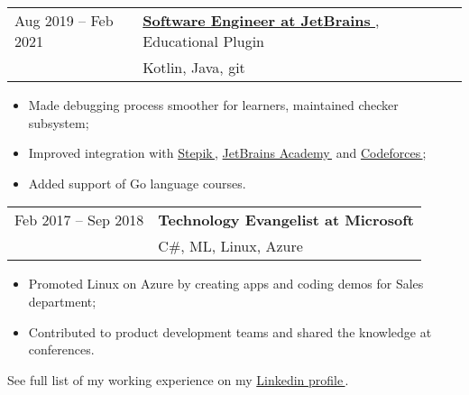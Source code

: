 \documentclass[11pt]{res} %
\let\orighref\href
\renewcommand{\href}[2]{\orighref{#1}{#2\,\faExternalLink}}
\begin{document}
\begin{resume}
        \begin{tabular}{ll}
            Aug 2019 -- Feb 2021 \quad & \textbf{\href{https://github.com/JetBrains/educational-plugin}{Software Engineer at JetBrains}}, Educational Plugin \\
            & Kotlin, Java, git \\
        \end{tabular}

        \begin{itemize} \itemsep -2pt
            \item Made debugging process smoother for learners, maintained checker subsystem;
            \item Improved integration with \href{https://stepik.org/}{Stepik}, \href{https://hyperskill.org}{JetBrains Academy} and \href{http://codeforces.com}{Codeforces};
            \item Added support of Go language courses.
        \end{itemize}


        \begin{tabular}{ll}
            Feb 2017 -- Sep 2018 \quad & {\textbf{Technology Evangelist at Microsoft}} \\
            & C\#, ML, Linux, Azure \\
        \end{tabular}

        \begin{itemize} \itemsep -2pt
            \item Promoted Linux on Azure by creating apps and coding demos for Sales department;
            \item Contributed to product development teams and shared the knowledge at conferences.
        \end{itemize}

        See full list of my working experience on my \href{https://www.linkedin.com/in/telezhnaya/}{Linkedin profile}.



\end{resume}
\end{document}
